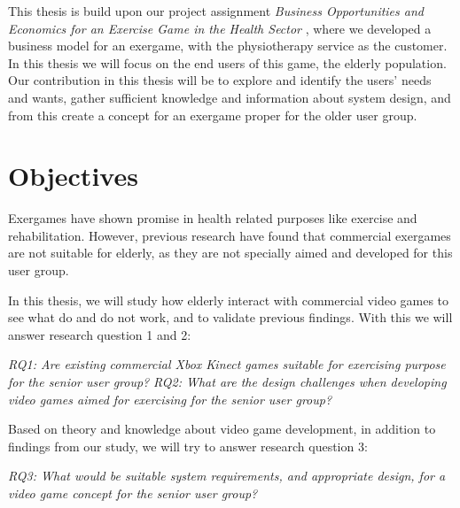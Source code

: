 This thesis is build upon our project assignment \emph{Business Opportunities and Economics for an Exercise Game in the Health Sector} \cite{project}, where we developed a business model for an exergame, with the physiotherapy service as the customer. In this thesis we will focus on the end users of this game, the elderly population. Our contribution in this thesis will be to explore and identify the users' needs and wants, gather sufficient knowledge and information about system design, and from this create a concept for an exergame proper for the older user group.

\section{Objectives}
\label{sec:researchq} Exergames have shown promise in health related purposes like exercise and rehabilitation. However, previous research have found that commercial exergames are not suitable for elderly, as they are not specially aimed and developed for this user group. 

In this thesis, we will study how elderly interact with commercial video games to see what do and do not work, and to validate previous findings. With this we will answer research question 1 and 2: 

\emph{RQ1: Are existing commercial Xbox Kinect games suitable for exercising purpose for the senior user group?} 
\emph{RQ2: What are the design challenges when developing video games aimed for exercising for the senior user group?}

Based on theory and knowledge about video game development, in addition to findings from our study, we will try to answer research question 3:

\emph{RQ3: What would be suitable system requirements, and appropriate design, for a video game concept for the senior user group?}

